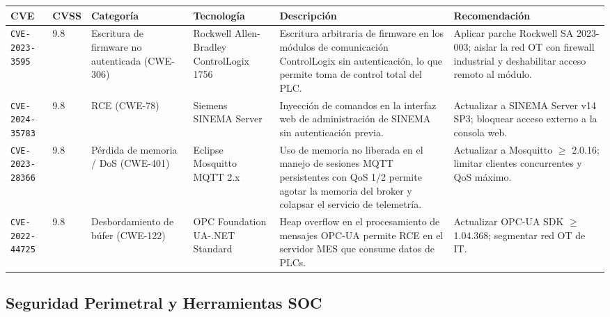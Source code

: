 \documentclass[letterpaper,11pt]{article}
\begin{document}
\begingroup\footnotesize
{}
\begin{tabular}{|p{2.3cm}|p{0.65cm}|p{1.9cm}|p{2.0cm}|p{3.9cm}|p{3.0cm}|}
\hline
\rowcolor{orange!30}
\textbf{CVE} & \textbf{CVSS} & \textbf{Categoría} & \textbf{Tecnología} & \textbf{Descripción} & \textbf{Recomendación} \\
\hline
\texttt{CVE-2023-3595} & 9.8 & Escritura de firmware no autenticada (CWE-306) & Rockwell Allen-Bradley ControlLogix 1756 & Escritura arbitraria de firmware en los módulos de comunicación ControlLogix sin autenticación, lo que permite toma de control total del PLC. & Aplicar parche Rockwell SA 2023-003; aislar la red OT con firewall industrial y deshabilitar acceso remoto al módulo. \\
\hline
\texttt{CVE-2024-35783} & 9.8 & RCE (CWE-78) & Siemens SINEMA Server & Inyección de comandos en la interfaz web de administración de SINEMA sin autenticación previa. & Actualizar a SINEMA Server v14 SP3; bloquear acceso externo a la consola web. \\
\hline
\texttt{CVE-2023-28366} & 9.8 & Pérdida de memoria / DoS (CWE-401) & Eclipse Mosquitto MQTT 2.x & Uso de memoria no liberada en el manejo de sesiones MQTT persistentes con QoS 1/2 permite agotar la memoria del broker y colapsar el servicio de telemetría. & Actualizar a Mosquitto $\geq$ 2.0.16; limitar clientes concurrentes y QoS máximo. \\
\hline
\texttt{CVE-2022-44725} & 9.8 & Desbordamiento de búfer (CWE-122) & OPC Foundation UA-.NET Standard & Heap overflow en el procesamiento de mensajes OPC-UA permite RCE en el servidor MES que consume datos de PLCs. & Actualizar OPC-UA SDK $\geq$ 1.04.368; segmentar red OT de IT. \\
\hline
\end{tabular}
\endgroup

\subsection{Seguridad Perimetral y Herramientas SOC}
\end{document}
